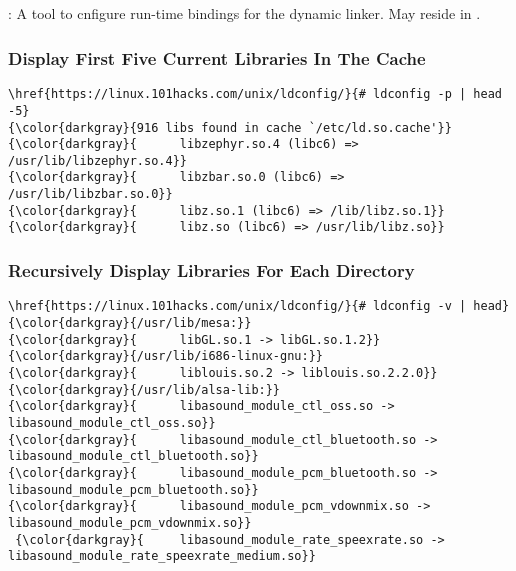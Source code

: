 % 

\subsection{\lddconfig}
\label{sec:lddconfig}

: A tool to cnfigure run-time bindings for the dynamic linker. May reside in .

		\subsubsection{Display First Five Current Libraries In The Cache}
{\footnotesize{
\begin{Verbatim}[commandchars=\\\{\}]
\href{https://linux.101hacks.com/unix/ldconfig/}{# ldconfig -p | head -5}
{\color{darkgray}{916 libs found in cache `/etc/ld.so.cache'}}
{\color{darkgray}{      libzephyr.so.4 (libc6) => /usr/lib/libzephyr.so.4}}
{\color{darkgray}{      libzbar.so.0 (libc6) => /usr/lib/libzbar.so.0}}
{\color{darkgray}{      libz.so.1 (libc6) => /lib/libz.so.1}}
{\color{darkgray}{      libz.so (libc6) => /usr/lib/libz.so}}
\end{Verbatim}
}}

		\subsubsection{Recursively Display Libraries For Each Directory}
{\footnotesize{
\begin{Verbatim}[commandchars=\\\{\}]
\href{https://linux.101hacks.com/unix/ldconfig/}{# ldconfig -v | head}
{\color{darkgray}{/usr/lib/mesa:}}
{\color{darkgray}{      libGL.so.1 -> libGL.so.1.2}}
{\color{darkgray}{/usr/lib/i686-linux-gnu:}}
{\color{darkgray}{      liblouis.so.2 -> liblouis.so.2.2.0}}
{\color{darkgray}{/usr/lib/alsa-lib:}}
{\color{darkgray}{      libasound_module_ctl_oss.so -> libasound_module_ctl_oss.so}}
{\color{darkgray}{      libasound_module_ctl_bluetooth.so -> libasound_module_ctl_bluetooth.so}}
{\color{darkgray}{      libasound_module_pcm_bluetooth.so -> libasound_module_pcm_bluetooth.so}}
{\color{darkgray}{      libasound_module_pcm_vdownmix.so -> libasound_module_pcm_vdownmix.so}}
 {\color{darkgray}{     libasound_module_rate_speexrate.so -> libasound_module_rate_speexrate_medium.so}}
\end{Verbatim}
}}

\endinput  %
